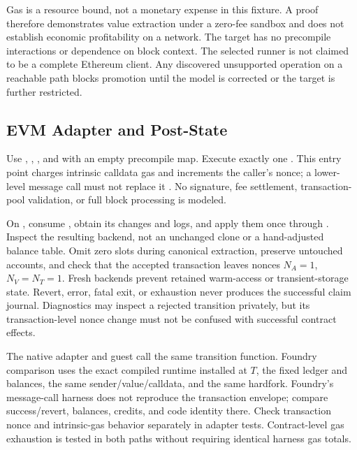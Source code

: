 \documentclass[11pt]{article}
\begin{document}
Gas is a resource bound, not a monetary expense in this fixture. A proof therefore demonstrates value extraction under a zero-fee sandbox and does not establish economic profitability on a network. The target has no precompile interactions or dependence on block context. The selected runner is not claimed to be a complete Ethereum client. Any discovered unsupported operation on a reachable path blocks promotion until the model is corrected or the target is further restricted.

\subsection{EVM Adapter and Post-State}
Use , , , and  with an empty precompile map. Execute exactly one . This entry point charges intrinsic calldata gas and increments the caller's nonce; a lower-level message call must not replace it \cite{evmsource}. No signature, fee settlement, transaction-pool validation, or full block processing is modeled.

On , consume , obtain its  changes and logs, and apply them once through . Inspect the resulting backend, not an unchanged clone or a hand-adjusted balance table. Omit zero slots during canonical extraction, preserve untouched accounts, and check that the accepted transaction leaves nonces \(N_A=1\), \(N_V=N_T=1\). Fresh backends prevent retained warm-access or transient-storage state. Revert, error, fatal exit, or exhaustion never produces the successful claim journal. Diagnostics may inspect a rejected transition privately, but its transaction-level nonce change must not be confused with successful contract effects.

The native adapter and guest call the same transition function. Foundry comparison uses the exact compiled runtime installed at \(T\), the fixed ledger and balances, the same sender/value/calldata, and the same hardfork. Foundry's message-call harness does not reproduce the transaction envelope; compare success/revert, balances, credits, and code identity there. Check transaction nonce and intrinsic-gas behavior separately in adapter tests. Contract-level gas exhaustion is tested in both paths without requiring identical harness gas totals.
\end{document}
